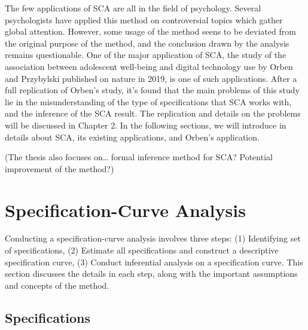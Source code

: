 \documentclass[12pt,twoside]{reedthesis}
\begin{document}
  \par 
  
  The few applications of SCA are all in the field of psychology. Several
  psychologists have applied this method on controversial topics which
  gather global attention. However, some usage of the method seens to be
  deviated from the original purpose of the method, and the conclusion
  drawn by the analysis remains questionable. One of the major application
  of SCA, the study of the association between adolescent well-being and
  digital technology use by Orben and Przybylski published on nature in
  2019, is one of such applications. After a full replication of Orben's
  study, it's found that the main problems of this study lie in the
  misunderstanding of the type of specifications that SCA works with, and
  the inference of the SCA result. The replication and details on the
  problems will be discussed in Chapter 2. In the following sections, we
  will introduce in details about SCA, its existing applications, and
  Orben's application.
  
  \par 
  
  (The thesis also focuses on\ldots{} formal inference method for SCA?
  Potential improvement of the method?)
  
  \section{Specification-Curve
  Analysis}\label{specification-curve-analysis}
  
  \par 
  
  Conducting a specification-curve analysis involves three steps: (1)
  Identifying set of specifications, (2) Estimate all specifications and
  construct a descriptive specification curve, (3) Conduct inferential
  analysis on a specification curve. This section discusses the details in
  each step, along with the important assumptions and concepts of the
  method.
  
  \subsection{Specifications}\label{specifications}
  
  \par 
  
\end{document}
